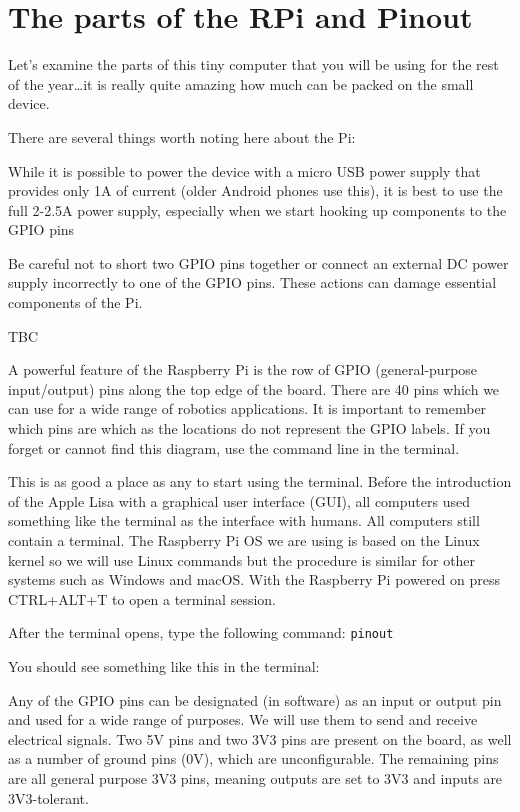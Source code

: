 \documentclass[
]{book}
\begin{document}
\hypertarget{the-parts-of-the-rpi-and-pinout}{%
\section{The parts of the RPi and Pinout}\label{the-parts-of-the-rpi-and-pinout}}

Let's examine the parts of this tiny computer that you will be using for the rest of the year\ldots it is really quite amazing how much can be packed on the small device.

There are several things worth noting here about the Pi:

While it is possible to power the device with a micro USB power supply that provides only 1A of current (older Android phones use this), it is best to use the full 2-2.5A power supply, especially when we start hooking up components to the GPIO pins

Be careful not to short two GPIO pins together or connect an external DC power supply incorrectly to one of the GPIO pins. These actions can damage essential components of the Pi.

TBC

A powerful feature of the Raspberry Pi is the row of GPIO (general-purpose input/output) pins along the top edge of the board. There are 40 pins which we can use for a wide range of robotics applications.
It is important to remember which pins are which as the locations do not represent the GPIO labels. If you forget or cannot find this diagram, use the command line in the terminal.

This is as good a place as any to start using the terminal. Before the introduction of the Apple Lisa with a graphical user interface (GUI), all computers used something like the terminal as the interface with humans. All computers still contain a terminal. The Raspberry Pi OS we are using is based on the Linux kernel so we will use Linux commands but the procedure is similar for other systems such as Windows and macOS. With the Raspberry Pi powered on press CTRL+ALT+T to open a terminal session.

After the terminal opens, type the following command: \texttt{pinout}

You should see something like this in the terminal:

Any of the GPIO pins can be designated (in software) as an input or output pin and used for a wide range of purposes. We will use them to send and receive electrical signals. Two 5V pins and two 3V3 pins are present on the board, as well as a number of ground pins (0V), which are unconfigurable. The remaining pins are all general purpose 3V3 pins, meaning outputs are set to 3V3 and inputs are 3V3-tolerant.
\end{document}
